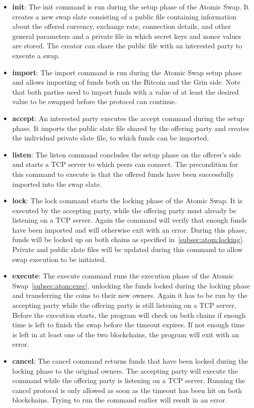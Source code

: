 \begin{itemize}
    \item \textbf{init}: The init command is run during the setup phase of the Atomic Swap.
    It creates a new swap slate consisting of a public file containing information about the offered currency, exchange rate, connection details, and other general parameters and a private file in which secret keys and nonce values are stored.
    The creator can share the public file with an interested party to execute a swap.
    \item \textbf{import}: The import command is run during the Atomic Swap setup phase and allows importing of funds both on the Bitcoin and the Grin side.
    Note that both parties need to import funds with a value of at least the desired value to be swapped before the protocol can continue.
    \item \textbf{accept}: An interested party executes the accept command during the setup phase.
    It imports the public slate file shared by the offering party and creates the individual private slate file, to which funds can be imported.
    \item \textbf{listen}: The listen command concludes the setup phase on the offerer's side and starts a TCP server to which peers can connect.
    The precondition for this command to execute is that the offered funds have been successfully imported into the swap slate.
    \item \textbf{lock}: The lock command starts the locking phase of the Atomic Swap.
    It is executed by the accepting party, while the offering party must already be listening on a TCP server.
    Again the command will verify that enough funds have been imported and will otherwise exit with an error.
    During this phase, funds will be locked up on both chains as specified in~\cref{subsec:atom:locking}.
    Private and public slate files will be updated during this command to allow swap execution to be initiated.
    \item \textbf{execute}: The execute command runs the execution phase of the Atomic Swap~\cref{subsec:atom:exec}, unlocking the funds locked during the locking phase and transferring the coins to their new owners.
    Again it has to be run by the accepting party while the offering party is still listening on a TCP server.
    Before the execution starts, the program will check on both chains if enough time is left to finish the swap before the timeout expires.
    If not enough time is left in at least one of the two blockchains, the program will exit with an error.
    \item \textbf{cancel}: The cancel command returns funds that have been locked during the locking phase to the original owners.
    The accepting party will execute the command while the offering party is listening on a TCP server.
    Running the cancel protocol is only allowed as soon as the timeout has been hit on both blockchains.
    Trying to run the command earlier will result in an error.
\end{itemize}

